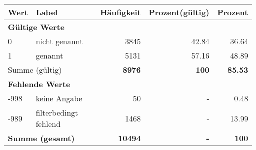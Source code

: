      \begin{longtable}{lXrrr}
     \toprule
     \textbf{Wert} & \textbf{Label} & \textbf{Häufigkeit} & \textbf{Prozent(gültig)} & \textbf{Prozent} \\
     \endhead
     \midrule
     \multicolumn{5}{l}{\textbf{Gültige Werte}}\\

     0 &
     \multicolumn{1}{X}{ nicht genannt   } &


       \num{3845} &
       \num[round-mode=places,round-precision=2]{42,84} &
         \num[round-mode=places,round-precision=2]{36,64} \\

     1 &
     \multicolumn{1}{X}{ genannt   } &


       \num{5131} &
       \num[round-mode=places,round-precision=2]{57,16} &
         \num[round-mode=places,round-precision=2]{48,89} \\
     \midrule
     \multicolumn{2}{l}{Summe (gültig)} &
       \textbf{\num{8976}} &
     \textbf{100} &
       \textbf{\num[round-mode=places,round-precision=2]{85,53}} \\
     \multicolumn{5}{l}{\textbf{Fehlende Werte}}\\
       -998 &
       keine Angabe &
         \num{50} &
        - &
         \num[round-mode=places,round-precision=2]{0,48} \\
       -989 &
       filterbedingt fehlend &
         \num{1468} &
        - &
         \num[round-mode=places,round-precision=2]{13,99} \\
     \midrule
     \multicolumn{2}{l}{\textbf{Summe (gesamt)}} &
          \textbf{\num{10494}} &
        \textbf{-} &
        \textbf{100} \\
     \bottomrule
     \end{longtable}
     

